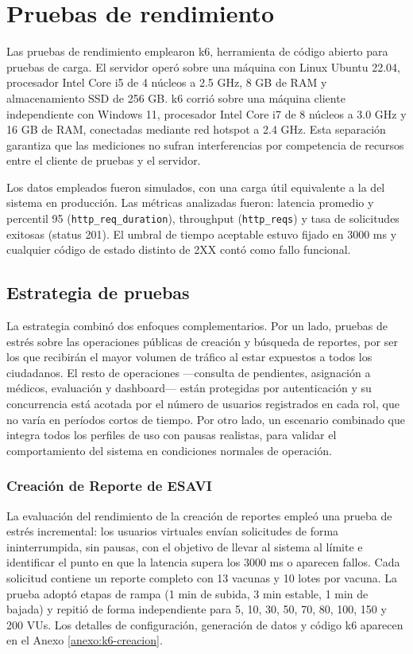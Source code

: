 \section{Pruebas de rendimiento}
\label{sec:entorno-pruebas}

Las pruebas de rendimiento emplearon k6, herramienta de código abierto para pruebas de carga.
El servidor operó sobre una máquina con Linux Ubuntu 22.04, procesador Intel Core i5 de 4 núcleos a 2.5 GHz, 8 GB de RAM y almacenamiento SSD de 256 GB.
k6 corrió sobre una máquina cliente independiente con Windows 11, procesador Intel Core i7 de 8 núcleos a 3.0 GHz y 16 GB de RAM, conectadas mediante red hotspot a 2.4 GHz.
Esta separación garantiza que las mediciones no sufran interferencias por competencia de recursos entre el cliente de pruebas y el servidor.

Los datos empleados fueron simulados, con una carga útil equivalente a la del sistema en producción.
Las métricas analizadas fueron: latencia promedio y percentil 95 (\texttt{http\_req\_duration}), throughput (\texttt{http\_reqs}) y tasa de solicitudes exitosas (status 201). 
El umbral de tiempo aceptable estuvo fijado en 3000 ms y cualquier código de estado distinto de 2XX contó como fallo funcional.

\subsection{Estrategia de pruebas}

La estrategia combinó dos enfoques complementarios.
Por un lado, pruebas de estrés sobre las operaciones públicas de creación y búsqueda de reportes, por ser los que recibirán el mayor volumen de tráfico al estar expuestos a todos los ciudadanos. 
El resto de operaciones —consulta de pendientes, asignación a médicos, evaluación y dashboard— están protegidas por autenticación y su concurrencia está acotada por el número de usuarios registrados en cada rol, que no varía en períodos cortos de tiempo. 
Por otro lado, un escenario combinado que integra todos los perfiles de uso con pausas realistas, para validar el comportamiento del sistema en condiciones normales de operación.

\subsubsection{Creación de Reporte de ESAVI}

La evaluación del rendimiento de la creación de reportes empleó una prueba de estrés incremental: los usuarios virtuales envían solicitudes de forma ininterrumpida, sin pausas, con el objetivo de llevar al sistema al límite e identificar el punto en que la latencia supera los 3000 ms o aparecen fallos.
Cada solicitud contiene un reporte completo con 13 vacunas y 10 lotes por vacuna. 
La prueba adoptó etapas de rampa (1 min de subida, 3 min estable, 1 min de bajada) y repitió de forma independiente para 5, 10, 30, 50, 70, 80, 100, 150 y 200 VUs.
Los detalles de configuración, generación de datos y código k6 aparecen en el Anexo \ref{anexo:k6-creacion}.


